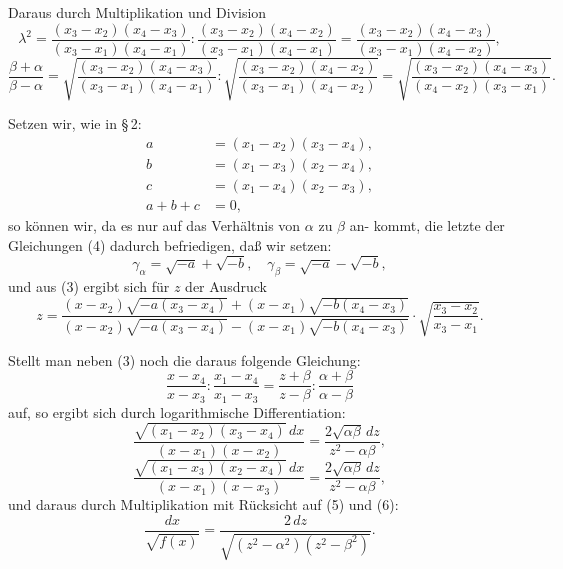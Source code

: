 \documentclass[12pt,a4paper]{book}
\theoremstyle{definition}
\begin{document}
Daraus durch Multiplikation und Division
\begin{equation}
\lambda^2 = \frac{(x_3 - x_2)(x_4 - x_3)}{(x_3 - x_1)(x_4 - x_1)} : \frac{(x_3 - x_2)(x_4 - x_2)}{(x_3 - x_1)(x_4 - x_1)} = \frac{(x_3 - x_2)(x_4 - x_3)}{(x_3 - x_1)(x_4 - x_2)},
\end{equation}
\begin{equation}
\frac{\beta + \alpha}{\beta - \alpha} = \sqrt{\frac{(x_3 - x_2)(x_4 - x_3)}{(x_3 - x_1)(x_4 - x_1)}} : \sqrt{\frac{(x_3 - x_2)(x_4 - x_2)}{(x_3 - x_1)(x_4 - x_2)}} = \sqrt{\frac{(x_3 - x_2)(x_4 - x_3)}{(x_4 - x_2)(x_3 - x_1)}}.
\end{equation}

Setzen wir, wie in \S\,2:
\begin{equation}
\begin{aligned}
a &= (x_1 - x_2)(x_3 - x_4),\\
b &= (x_1 - x_3)(x_2 - x_4),\\
c &= (x_1 - x_4)(x_2 - x_3),\\
a + b + c &= 0,
\end{aligned}
\tag{5}
\end{equation}
so k\"onnen wir, da es nur auf das Verh\"altnis von $\alpha$ zu $\beta$ an-
kommt, die letzte der Gleichungen (4) dadurch befriedigen, da\ss
wir setzen:
\begin{equation}
\gamma_\alpha = \sqrt{-a} + \sqrt{-b}, \quad \gamma_\beta = \sqrt{-a} - \sqrt{-b}, \tag{6}
\end{equation}
und aus (3) ergibt sich f\"ur $z$ der Ausdruck
\begin{equation}
z = \frac{(x - x_2)\sqrt{-a(x_3 - x_4)} + (x - x_1)\sqrt{-b(x_4 - x_3)}}{(x - x_2)\sqrt{-a(x_3 - x_4)} - (x - x_1)\sqrt{-b(x_4 - x_3)}} \cdot \sqrt{\frac{x_3 - x_2}{x_3 - x_1}}.
\end{equation}

Stellt man neben (3) noch die daraus folgende Gleichung:
\[
\frac{x - x_4}{x - x_3} : \frac{x_1 - x_4}{x_1 - x_3} = \frac{z + \beta}{z - \beta} : \frac{\alpha + \beta}{\alpha - \beta}
\]
auf, so ergibt sich durch logarithmische Differentiation:
\begin{equation}
\frac{\sqrt{(x_1 - x_2)(x_3 - x_4)}\,dx}{(x - x_1)(x - x_2)} = \frac{2\sqrt{\alpha\beta}\,dz}{z^2 - \alpha\beta},
\end{equation}
\begin{equation}
\frac{\sqrt{(x_1 - x_3)(x_2 - x_4)}\,dx}{(x - x_1)(x - x_3)} = \frac{2\sqrt{\alpha\beta}\,dz}{z^2 - \alpha\beta},
\end{equation}
und daraus durch Multiplikation mit R\"ucksicht auf (5) und (6):
\begin{equation}
\frac{dx}{\sqrt{f(x)}} = \frac{2\,dz}{\sqrt{(z^2 - \alpha^2)(z^2 - \beta^2)}}.
\end{equation}
\end{document}
